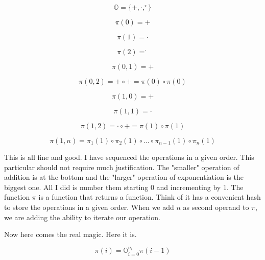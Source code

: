 \begin{equation}
    \mathbb{O} = \{+, \cdot, ^\circ\}
\end{equation}

\begin{equation}
    \pi(0) = +
\end{equation}

\begin{equation}
    \pi(1) = \cdot
\end{equation}

\begin{equation}
    \pi(2) = ^\cdot
\end{equation}

\begin{equation}
    \pi(0,1) = +
\end{equation}

\begin{equation}
    \pi(0,2) = + \circ + = \pi(0) \circ \pi(0)
\end{equation}

\begin{equation}
    \pi(1,0) = +
\end{equation}

\begin{equation}
    \pi(1,1) = \cdot
\end{equation}

\begin{equation}
    \pi(1,2) = \cdot \circ + = \pi(1) \circ \pi(1)
\end{equation}

\begin{equation}
    \pi(1,n) = \pi_1(1) \circ \pi_2(1) \circ \dots \circ \pi_{n-1}(1) \circ \pi_n(1)
\end{equation}

This is all fine and good. I have sequenced the operations in a given order.
This particular should not require much justification. The "smaller" operation
of addition is at the bottom and the "larger" operation of exponentiation is
the biggest one. All I did is number them starting 0 and incrementing by 1. The
function $\pi$ is a function that returns a function. Think of it has a
convenient hash to store the operations in a given order. When we add $n$ as
second operand to $\pi$, we are adding the ability to iterate our operation.

Now here comes the real magic. Here it is.

\begin{equation}
    \pi(i) = \mathbb{O}_{i=0}^{n_i} \pi(i-1)
    \label{eq:pi-reduc}
\end{equation}


